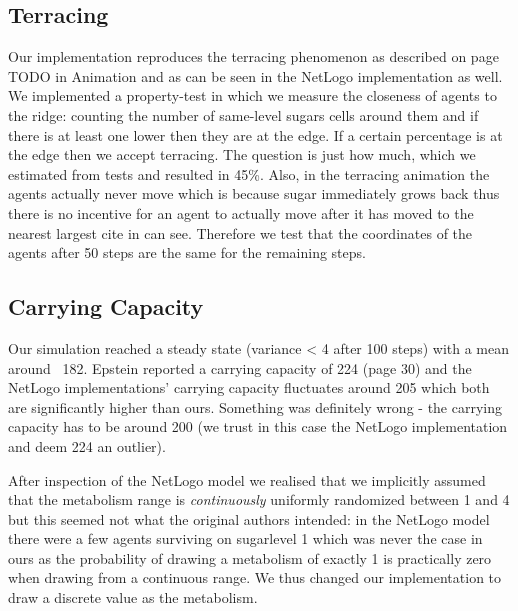 \subsection{Terracing}
Our implementation reproduces the terracing phenomenon as described on page TODO in Animation and as can be seen in the NetLogo implementation as well. We implemented a property-test in which we measure the closeness of agents to the ridge: counting the number of same-level sugars cells around them and if there is at least one lower then they are at the edge. If a certain percentage is at the edge then we accept terracing. The question is just how much, which we estimated from tests and resulted in 45\%. Also, in the terracing animation the agents actually never move which is because sugar immediately grows back thus there is no incentive for an agent to actually move after it has moved to the nearest largest cite in can see. Therefore we test that the coordinates of the agents after 50 steps are the same for the remaining steps.

\subsection{Carrying Capacity}
Our simulation reached a steady state (variance < 4 after 100 steps) with a mean around ~182. Epstein reported a carrying capacity of 224 (page 30) and the NetLogo implementations' \cite{weaver_replicating_2009} carrying capacity fluctuates around 205 which both are significantly higher than ours. Something was definitely wrong - the carrying capacity has to be around 200 (we trust in this case the NetLogo implementation and deem 224 an outlier).

After inspection of the NetLogo model we realised that we implicitly assumed that the metabolism range is \textit{continuously} uniformly randomized between 1 and 4 but this seemed not what the original authors intended: in the NetLogo model there were a few agents surviving on sugarlevel 1 which was never the case in ours as the probability of drawing a metabolism of exactly 1 is practically zero when drawing from a continuous range. We thus changed our implementation to draw a discrete value as the metabolism. %


